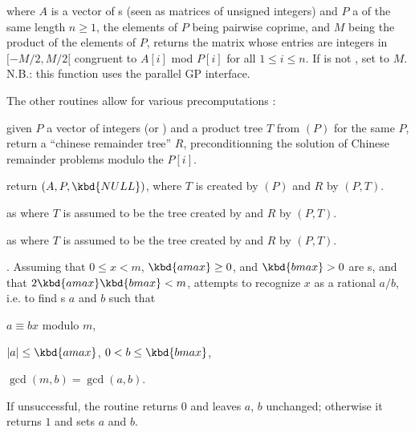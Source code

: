  where $A$ is a
vector of s (seen as matrices of unsigned integers) and $P$ a
 of the same length $n\ge 1$, the elements of $P$ being
pairwise coprime, and $M$ being the product of the elements of $P$, returns
the matrix whose entries are integers in $[-M/2, M/2[$ congruent to $A[i]$
mod $P[i]$ for all $1\leq i\leq n$. If  is not , set
 to $M$. N.B.: this function uses the parallel GP interface.

The other routines allow for various precomputations :

 given $P$ a vector of integers
(or ) and a product tree $T$ from $(P)$
for the same $P$, return a ``chinese remainder tree'' $R$, preconditionning
the solution of Chinese remainder problems modulo the $P[i]$.

return $(A,P,\kbd{NULL})$, where $T$ is created by
$(P)$ and $R$ by $(P,T)$.

as  where $T$ is assumed to be the tree created by
 and $R$ by $(P,T)$.

as  where $T$ is assumed to be the tree created by
 and $R$ by $(P,T)$.


.
Assuming that $0 \leq x < m$, $\kbd{amax} \geq 0$, and
$\kbd{bmax} > 0$ are s, and that $2 \kbd{amax} \kbd{bmax} < m$,
attempts to recognize $x$ as a rational $a/b$, i.e. to find s $a$
and $b$ such that

\item $a \equiv b x$ modulo $m$,

\item $|a| \leq \kbd{amax}$, $0 < b \leq \kbd{bmax}$,

\item $\gcd(m,b) = \gcd(a,b)$.

\noindent If unsuccessful, the routine returns $0$ and leaves $a$, $b$
unchanged; otherwise it returns $1$ and sets $a$ and $b$.

